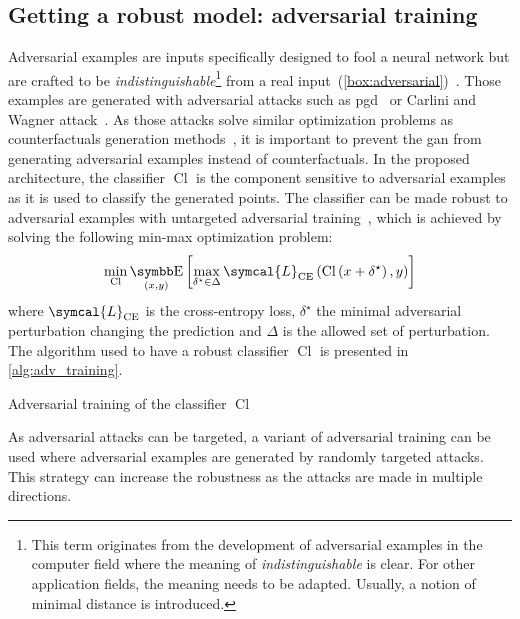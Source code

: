 \documentclass[../main.tex]{subfiles}
\begin{document}
	\subsection{Getting a robust model: adversarial training}
		Adversarial examples are inputs specifically designed to fool a neural network but are crafted to be \emph{indistinguishable}\footnote{This term originates from the development of adversarial examples in the computer field where the meaning of \emph{indistinguishable} is clear. For other application fields, the meaning needs to be adapted.
			Usually, a notion of minimal distance is introduced.} from a real input~(\cref{box:adversarial})~\cite{Szegedy2013IntriguingPO}.
		Those examples are generated with adversarial attacks such as \gls{pgd}~\cite{PGDAttacks2} or Carlini and Wagner attack~\cite{Carlini2016TowardsET}.
		As those attacks solve similar optimization problems as counterfactuals generation methods~\cite{Pawelczyk2021ExploringCE,Freiesleben2021}, it is important to prevent the \gls{gan} from generating adversarial examples instead of counterfactuals.
		In the proposed architecture, the classifier \(\operatorname{Cl}\) is the component sensitive to adversarial examples as it is used to classify the generated points.
		The classifier can be made robust to adversarial examples with untargeted adversarial training~\cite{AdvTrainingMinMax}, which is achieved by solving the following min-max optimization problem:
		\begin{equation}
			\min_{\operatorname{Cl}} \E_{(x,y)}\left[\max_{\delta^{\star} \in \Delta} \symcal{L}_{\text{CE}}\left(\operatorname{Cl}\left(x+\delta^{\star}\right), y \right)  \right]
		\end{equation}
		where \(\symcal{L}_{\text{CE}}\) is the cross-entropy loss, \(\delta^{\star}\) the minimal adversarial perturbation changing the prediction and \(\Delta\) is the allowed set of perturbation.
		The algorithm used to have a robust classifier \(\operatorname{Cl}\) is presented in \cref{alg:adv_training}.
		\begin{algorithm}[htbp]
			\DontPrintSemicolon
			\caption{Adversarial training of the classifier \(\operatorname{Cl}\)}\label{alg:adv_training}
		\end{algorithm}
		As adversarial attacks can be targeted, a variant of adversarial training can be used where adversarial examples are generated by randomly targeted attacks.
		This strategy can increase the robustness as the attacks are made in multiple directions.
\end{document}
